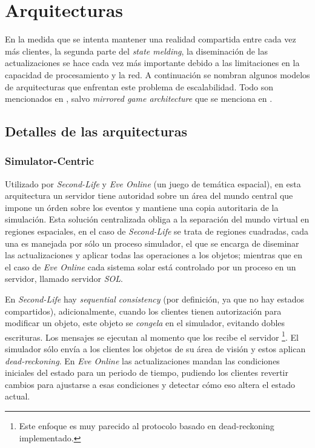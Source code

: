 \section{Arquitecturas}

En la medida que se intenta mantener una realidad compartida entre cada vez más clientes, la segunda parte del \emph{state melding}, la diseminación de las actualizaciones se hace cada vez más importante debido a las limitaciones en la capacidad de procesamiento y la red. A continuación se nombran algunos modelos de arquitecturas que enfrentan este problema de escalabilidad. Todo son mencionados en \cite{liu2012survey}, salvo \emph{mirrored game architecture} que se menciona en \cite{cronin2004efficient}.

\subsection{Detalles de las arquitecturas}

\subsubsection{Simulator-Centric}

Utilizado por \emph{Second-Life} y \emph{Eve Online} (un juego de temática espacial), en esta arquitectura un servidor tiene autoridad sobre un área del mundo central que impone un órden sobre los eventos y mantiene una copia autoritaria de la simulación. Esta solución centralizada obliga a la separación del mundo virtual en regiones espaciales, en el caso de \emph{Second-Life} se trata de regiones cuadradas, cada una es manejada por sólo un proceso simulador, el que se encarga de diseminar las actualizaciones y aplicar todas las operaciones a los objetos; mientras que en el caso de \emph{Eve Online} cada sistema solar está controlado por un proceso en un servidor, llamado servidor \emph{SOL}.

En \emph{Second-Life} hay \emph{sequential consistency} (por definición, ya que no hay estados compartidos), adicionalmente, cuando los clientes tienen autorización para modificar un objeto, este objeto se \emph{congela} en el simulador, evitando dobles escrituras. Los mensajes se ejecutan al momento que los recibe el servidor \footnote{Este enfoque es muy parecido al protocolo basado en dead-reckoning implementado.}. El simulador sólo envía a los clientes los objetos de su área de visión y estos aplican \emph{dead-reckoning}. En \emph{Eve Online} las actualizaciones mandan las condiciones iniciales del estado para un periodo de tiempo, pudiendo los clientes revertir cambios para ajustarse a esas condiciones y detectar cómo eso altera el estado actual.

